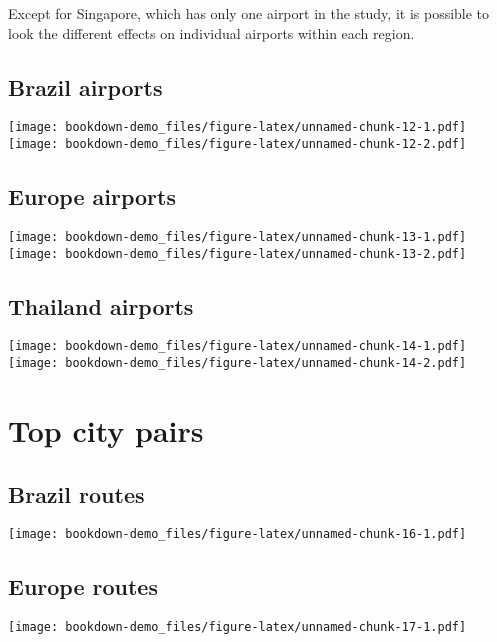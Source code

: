 \documentclass[
]{book}
\begin{document}
Except for Singapore, which has only one airport in the study, it is possible to look the different effects on individual airports within each region.

\hypertarget{brazil-airports-1}{%
\section{Brazil airports}\label{brazil-airports-1}}

\texttt{[image: bookdown-demo\_files/figure-latex/unnamed-chunk-12-1.pdf]} \texttt{[image: bookdown-demo\_files/figure-latex/unnamed-chunk-12-2.pdf]}

\hypertarget{europe-airports-1}{%
\section{Europe airports}\label{europe-airports-1}}

\texttt{[image: bookdown-demo\_files/figure-latex/unnamed-chunk-13-1.pdf]} \texttt{[image: bookdown-demo\_files/figure-latex/unnamed-chunk-13-2.pdf]}

\hypertarget{thailand-airports-1}{%
\section{Thailand airports}\label{thailand-airports-1}}

\texttt{[image: bookdown-demo\_files/figure-latex/unnamed-chunk-14-1.pdf]} \texttt{[image: bookdown-demo\_files/figure-latex/unnamed-chunk-14-2.pdf]}

\hypertarget{top-city-pairs}{%
\chapter{Top city pairs}\label{top-city-pairs}}

\hypertarget{brazil-routes}{%
\section{Brazil routes}\label{brazil-routes}}

\texttt{[image: bookdown-demo\_files/figure-latex/unnamed-chunk-16-1.pdf]}

\hypertarget{europe-routes}{%
\section{Europe routes}\label{europe-routes}}

\texttt{[image: bookdown-demo\_files/figure-latex/unnamed-chunk-17-1.pdf]}

  
\end{document}
